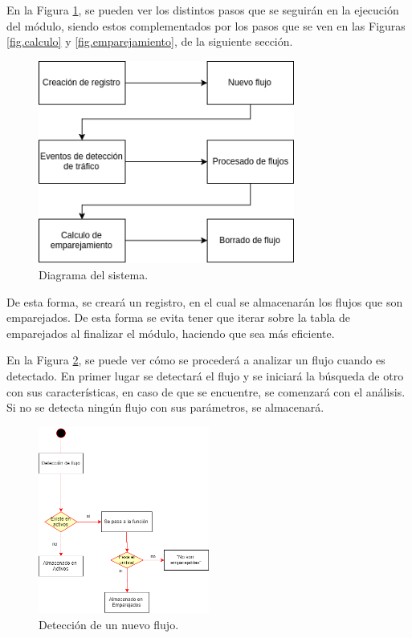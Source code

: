 \intro En la Figura \ref{fig.digsistema}, se pueden ver los distintos pasos que se seguirán en la ejecución del módulo, siendo estos 
complementados por los pasos que se ven en las Figuras \ref{fig.calculo} y \ref{fig.emparejamiento}, de la siguiente sección.

\begin{figure}[H]
  \includegraphics[width=0.75\textwidth]{imagenes/DiagramaSistema.png}
  \centering
  \caption{Diagrama del sistema.}\label{fig.digsistema}
\end{figure}

\intro De esta forma, se creará un registro, en el cual se almacenarán los flujos que son emparejados. De esta forma se evita tener 
que iterar sobre la tabla de emparejados al finalizar el módulo, haciendo que sea más eficiente.

\intro En la Figura \ref{fig.nacimiento}, se puede ver cómo se procederá a analizar un flujo cuando es detectado. En primer lugar se 
detectará el flujo y se iniciará la búsqueda de otro con sus características, en caso de que se encuentre, se comenzará con el 
análisis. Si no se detecta ningún flujo con sus parámetros, se almacenará.

\begin{figure}[H]
  \includegraphics[width=0.5\textwidth]{imagenes/nacimiento.png}
  \centering
  \caption{Detección de un nuevo flujo.}\label{fig.nacimiento}
\end{figure}

